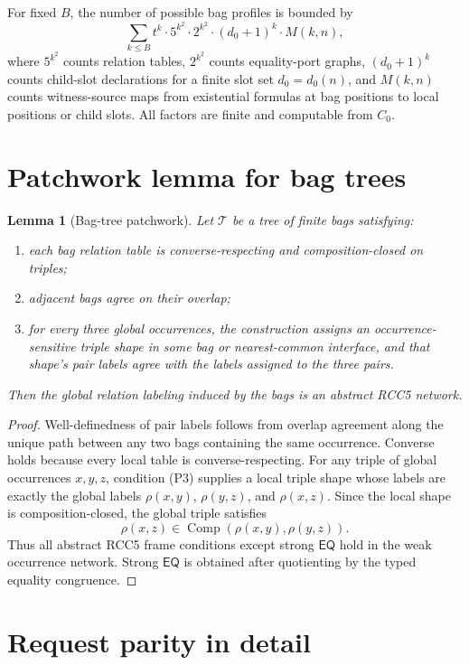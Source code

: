 \documentclass[11pt]{article}
\newtheorem{lemma}[theorem]{Lemma}
\newcommand{\EQ}{\mathsf{EQ}}
\newcommand{\Comp}{\operatorname{Comp}}
\begin{document}
For fixed $B$, the number of possible bag profiles is bounded by
\[
  \sum_{k\le B}
  t^k\cdot 5^{k^2}\cdot 2^{k^2}\cdot (d_0+1)^k\cdot M(k,n),
\]
where $5^{k^2}$ counts relation tables, $2^{k^2}$ counts equality-port graphs, $(d_0+1)^k$ counts child-slot declarations for a finite slot set $d_0=d_0(n)$, and $M(k,n)$ counts witness-source maps from existential formulas at bag positions to local positions or child slots.  All factors are finite and computable from $C_0$.

\section{Patchwork lemma for bag trees}

\begin{lemma}[Bag-tree patchwork]
Let $\mathcal T$ be a tree of finite bags satisfying:
\begin{enumerate}[label=(P\arabic*)]
\item each bag relation table is converse-respecting and composition-closed on triples;
\item adjacent bags agree on their overlap;
\item for every three global occurrences, the construction assigns an occurrence-sensitive triple shape in some bag or nearest-common interface, and that shape's pair labels agree with the labels assigned to the three pairs.
\end{enumerate}
Then the global relation labeling induced by the bags is an abstract RCC5 network.
\end{lemma}

\begin{proof}
Well-definedness of pair labels follows from overlap agreement along the unique path between any two bags containing the same occurrence.  Converse holds because every local table is converse-respecting.  For any triple of global occurrences $x,y,z$, condition (P3) supplies a local triple shape whose labels are exactly the global labels $\rho(x,y)$, $\rho(y,z)$, and $\rho(x,z)$.  Since the local shape is composition-closed, the global triple satisfies
\[
  \rho(x,z)\in\Comp(\rho(x,y),\rho(y,z)).
\]
Thus all abstract RCC5 frame conditions except strong $\EQ$ hold in the weak occurrence network.  Strong $\EQ$ is obtained after quotienting by the typed equality congruence.
\end{proof}

\section{Request parity in detail}
\end{document}
